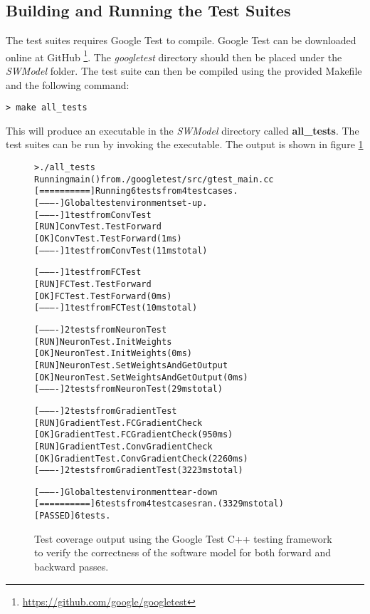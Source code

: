 \subsection{Building and Running the Test Suites}
The test suites requires Google Test to compile. Google Test can be downloaded online at GitHub \footnote{\url{https://github.com/google/googletest}}. The \textit{googletest} directory should then be placed under the \textit{SWModel} folder. The test suite can then be compiled using the provided Makefile and the following command:
\begin{lstlisting}
> make all_tests
\end{lstlisting}
This will produce an executable in the \textit{SWModel} directory called \textbf{all\_tests}. The test suites can be run by invoking the executable. The output is shown in figure \ref{goog-out}
\begin{figure}

\begin{framed}
\begin{alltt}
> ./all\_tests
Running main() from ./googletest/src/gtest\_main.cc
{\color{mygreen}[==========]} Running 6 tests from 4 test cases.
{\color{mygreen}[----------]} Global test environment set-up.
{\color{mygreen}[----------]} 1 test from ConvTest
{\color{mygreen}[ RUN      ]} ConvTest.TestForward
{\color{mygreen}[       OK ]} ConvTest.TestForward (1 ms)
{\color{mygreen}[----------]} 1 test from ConvTest (11 ms total)

{\color{mygreen}[----------]} 1 test from FCTest
{\color{mygreen}[ RUN      ]} FCTest.TestForward
{\color{mygreen}[       OK ]} FCTest.TestForward (0 ms)
{\color{mygreen}[----------]} 1 test from FCTest (10 ms total)

{\color{mygreen}[----------]} 2 tests from NeuronTest
{\color{mygreen}[ RUN      ]} NeuronTest.InitWeights
{\color{mygreen}[       OK ]} NeuronTest.InitWeights (0 ms)
{\color{mygreen}[ RUN      ]} NeuronTest.SetWeightsAndGetOutput
{\color{mygreen}[       OK ]} NeuronTest.SetWeightsAndGetOutput (0 ms)
{\color{mygreen}[----------]} 2 tests from NeuronTest (29 ms total)

{\color{mygreen}[----------]} 2 tests from GradientTest
{\color{mygreen}[ RUN      ]} GradientTest.FCGradientCheck
{\color{mygreen}[       OK ]} GradientTest.FCGradientCheck (950 ms)
{\color{mygreen}[ RUN      ]} GradientTest.ConvGradientCheck
{\color{mygreen}[       OK ]} GradientTest.ConvGradientCheck (2260 ms)
{\color{mygreen}[----------]} 2 tests from GradientTest (3223 ms total)

{\color{mygreen}[----------]} Global test environment tear-down
{\color{mygreen}[==========]} 6 tests from 4 test cases ran. (3329 ms total)
{\color{mygreen}[  PASSED  ]} 6 tests.
\end{alltt}
\end{framed}
\caption{Test coverage output using the Google Test C++ testing framework to verify the correctness of the software model for both forward and backward passes.}
\label{goog-out}
\end{figure}

